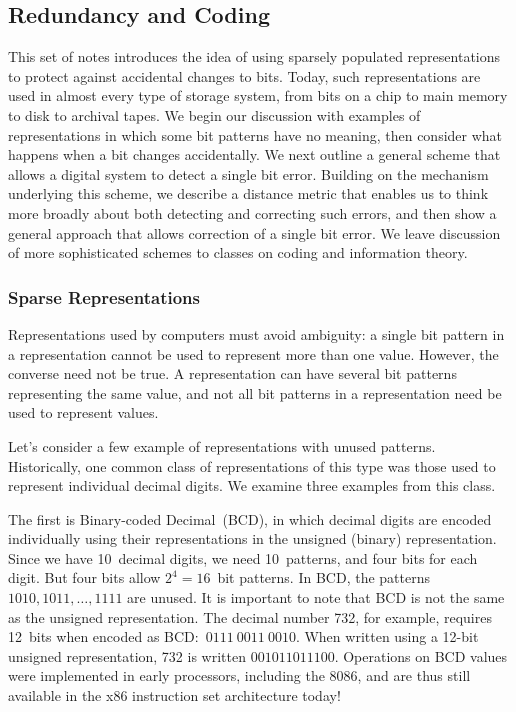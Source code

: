 \classtitle

\subsection{Redundancy and Coding}

This set of notes introduces the idea of using sparsely populated
representations to protect against accidental changes to bits.
Today, such representations are used in almost every type of storage
system, from bits on a chip to main memory to disk to archival tapes.
%
We begin our discussion with examples of representations in which some 
bit patterns have no meaning, then consider what happens when a bit 
changes accidentally.  We next outline a general scheme 
that allows a digital system to detect a single bit error.
%
Building on the mechanism underlying this scheme,
we describe a distance metric that enables us to think more broadly about 
both detecting and correcting such errors, and then show a general
approach that allows correction of a single bit error.
%
We leave discussion of more sophisticated schemes to classes on
coding and information theory.\\


\subsubsection{Sparse Representations}

Representations used by computers must avoid ambiguity: a single
bit pattern in a representation cannot be used to represent more than
one value.  However, the converse need not be true.  A representation can
have several bit patterns representing the same value, and
not all bit patterns in a representation need be
used to represent values.

Let's consider a few example of representations with unused patterns.
Historically, one common class of representations of this type was 
those used to represent individual decimal digits.  We examine three
examples from this class.

The first is Binary-coded Decimal~(BCD), in which
decimal digits are encoded individually 
using their representations in the unsigned
(binary) representation.  Since we have 10~decimal digits, we need 
10~patterns, and four bits for each digit.  But four bits allow 
$2^4=16$~bit patterns.  In BCD, the patterns $1010,1011,\ldots,1111$
are unused.  It is important to note that BCD is not the same as the
unsigned representation.  The decimal number 732, for example, requires 12~bits
when encoded as BCD:~$0111~0011~0010$.  When written using a \mbox{12-bit}
unsigned representation, 732 is written $001011011100$.  Operations
on BCD values were implemented in early processors, including the
8086, and are thus still available in the x86 instruction set architecture
today!\vspace{2pt}

